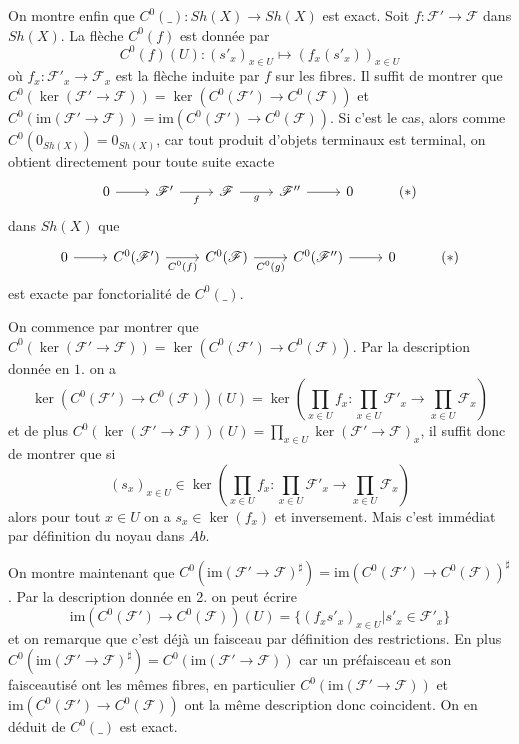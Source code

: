 \documentclass[a4paper,12pt]{article}
\newcommand{\F}{\mathscr F}
\newcommand{\im}{\textrm{im}}
\theoremstyle{plain}
\theoremstyle{definition}
\theoremstyle{remark}
\begin{document}
On montre enfin que $C^0(\_)\colon Sh(X)\to Sh(X)$ est
exact. Soit $f\colon \F'\to\F$ dans $Sh(X)$. La flèche $C^0(f)$ est 
donnée par
\[C^0(f)(U)\colon (s'_x)_{x\in U}\mapsto (f_x(s'_x))_{x\in U}\] 
où $f_x\colon \F'_x\to \F_x$ est la flèche induite par $f$ sur les
fibres. Il suffit de montrer que 
$C^0(\ker(\F'\to \F))=\ker(C^0(\F')\to C^0(\F))$
et $C^0(\im(\F'\to \F))=\im(C^0(\F')\to C^0(\F))$. Si c'est le cas,
alors comme $C^0(0_{Sh(X)})=0_{Sh(X)}$, car tout produit d'objets
terminaux est terminal, on obtient directement pour toute suite exacte
\[\begin{tikzcd}
	0 & {\F'} & \F & {\F''} & 0 & {(*)}
	\arrow[from=1-1, to=1-2]
	\arrow["f"', from=1-2, to=1-3]
	\arrow["g"', from=1-3, to=1-4]
	\arrow[from=1-4, to=1-5]
\end{tikzcd}\]
dans $Sh(X)$ que
\[\begin{tikzcd}
	0 & {C^0(\F')} & {C^0(\F)} & {C^0(\F'')} & 0 & {(*)}
	\arrow[from=1-1, to=1-2]
	\arrow["C^0(f)"', from=1-2, to=1-3]
	\arrow["C^0(g)"', from=1-3, to=1-4]
	\arrow[from=1-4, to=1-5]
\end{tikzcd}\]
est exacte par fonctorialité de $C^0(\_)$. 

On commence par montrer que
$C^0(\ker(\F'\to \F))=\ker(C^0(\F')\to C^0(\F))$. Par la description
donnée en $1.$ on a 
\[\ker(C^0(\F')\to C^0(\F))(U)=\ker(\prod_{x\in U} f_x\colon \prod_{x\in U} \F'_x\to \prod_{x\in U} \F_x)\]
et de plus $C^0(\ker(\F'\to \F))(U)=\prod_{x\in U}\ker(\F'\to\F)_x$, 
il suffit donc de montrer que si 
\[(s_x)_{x\in U}\in \ker(\prod_{x\in U} f_x\colon \prod_{x\in U} \F'_x\to \prod_{x\in U} \F_x)\]
alors pour tout $x\in U$ on a $s_x\in \ker(f_x)$ et inversement.
Mais c'est immédiat par définition du noyau dans $Ab$. 

On montre maintenant que 
$C^0(\im(\F'\to \F)^\sharp)=\im(C^0(\F')\to C^0(\F))^\sharp$.
Par la description donnée en 2. on peut écrire 
\[\im(C^0(\F')\to C^0(\F))(U)=\{(f_xs'_x)_{x\in U}| s'_x\in \F'_x\}\]
et on remarque que c'est déjà un faisceau par définition des 
restrictions. En plus $C^0(\im(\F'\to \F)^\sharp)=C^0(\im(\F'\to\F))$
car un préfaisceau et son faisceautisé ont les mêmes fibres, en
particulier $C^0(\im(\F'\to\F))$ et $\im(C^0(\F')\to C^0(\F))$ ont 
la même description donc coincident. On en déduit de $C^0(\_)$ est
exact.
\end{document}
